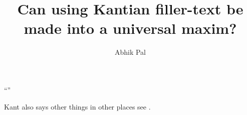 \documentclass[12pt, a4paper]{anmolmla}
\author{Abhik Pal}
\title{%
    Can using Kantian filler-text be made into a universal maxim?
}
\begin{document}
``\kant[1-6]''

Kant also says other things in other places see \cite{GMM}.
\end{document}
